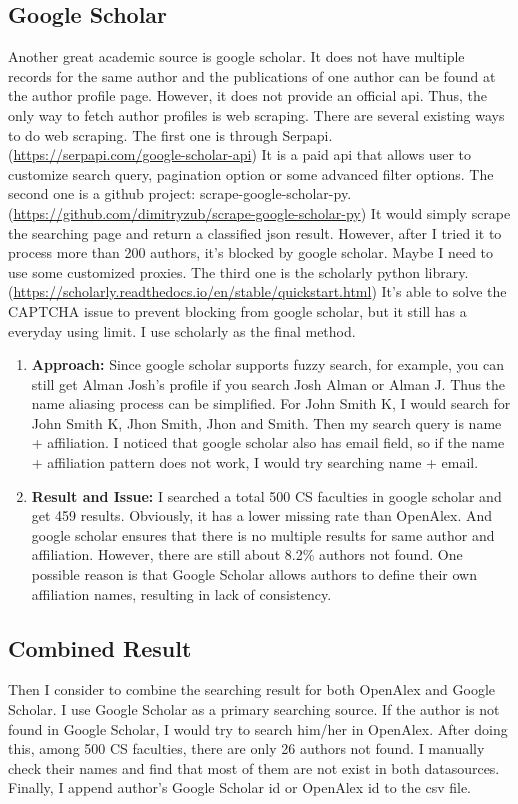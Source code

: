\documentclass[../report.tex]{subfiles}
\begin{document}
\subsection{Google Scholar}
\hspace{0.5cm} Another great academic source is google scholar. It does not have multiple records for the same author and the publications of one author can be found at the author profile page. However, it does not provide an official api. Thus, the only way to fetch author profiles is web scraping. There are several existing ways to do web scraping. The first one is through Serpapi. (\url{https://serpapi.com/google-scholar-api}) It is a paid api that allows user to customize search query, pagination option or some advanced filter options. The second one is a github project: scrape-google-scholar-py.(\url{https://github.com/dimitryzub/scrape-google-scholar-py}) It would simply scrape the searching page and return a classified json result. However, after I tried it to process more than 200 authors, it's blocked by google scholar. Maybe I need to use some customized proxies. The third one is the scholarly python library. (\url{https://scholarly.readthedocs.io/en/stable/quickstart.html}) It's able to solve the CAPTCHA issue to prevent blocking from google scholar, but it still has a everyday using limit. I use scholarly as the final method.
\begin{enumerate}
  \item \textbf{Approach: } Since google scholar supports fuzzy search, for example, you can still get Alman Josh's profile if you search Josh Alman or Alman J. Thus the name aliasing process can be simplified. For John Smith K, I would search for John Smith K, Jhon Smith, Jhon and Smith. Then my search query is name + affiliation. I noticed that google scholar also has email field, so if the name + affiliation pattern does not work, I would try searching name + email.
  \item \textbf{Result and Issue: } I searched a total 500 CS faculties in google scholar and get 459 results. Obviously, it has a lower missing rate than OpenAlex. And google scholar ensures that there is no multiple results for same author and affiliation. However, there are still about 8.2\% authors not found. One possible reason is that Google Scholar allows authors to define their own affiliation names, resulting in lack of consistency. 
\end{enumerate}

\subsection{Combined Result}
\hspace{0.5cm} Then I consider to combine the searching result for both OpenAlex and Google Scholar. I use Google Scholar as a primary searching source. If the author is not found in Google Scholar, I would try to search him/her in OpenAlex. After doing this, among 500 CS faculties, there are only 26 authors not found. I manually check their names and find that most of them are not exist in both datasources. Finally, I append author's Google Scholar id or OpenAlex id to the csv file.
\end{document}
